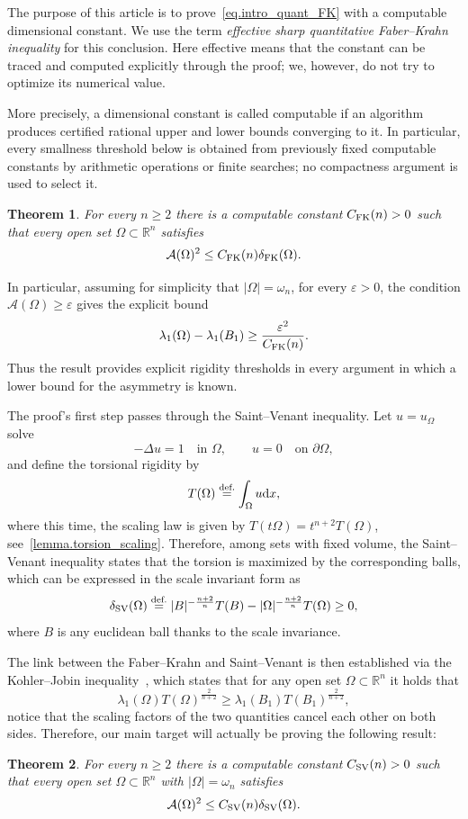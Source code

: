 \documentclass[11pt]{amsart}
\newcommand{\theoname}{Theorem}
\theoremstyle{plain}
\newtheorem{theorem}{\theoname}[section]
\theoremstyle{definition}
\newcommand{\eqdef}{\overset{\text{def.}}{=}}
\def\dd{{\rm d}}
\newcommand\SV{\mathop{\rm SV}}
\begin{document}
The purpose of this article is to prove~\eqref{eq.intro_quant_FK} with a
computable dimensional constant. We use the term \emph{effective sharp
quantitative Faber--Krahn inequality} for this conclusion. Here effective
means that the constant can be traced and computed explicitly through the proof; we, however, do not try to optimize
its numerical value.

More precisely, a dimensional constant is called computable if an algorithm produces certified rational upper and lower bounds
converging to it. In particular, every smallness threshold below is obtained from previously fixed computable constants by arithmetic operations or finite searches; no compactness argument is used to select it.

\begin{theorem}\label{thm.sharp_FK}
For every $n\ge2$ there is a computable constant $C_{\rm FK}(n)>0$ such
that every open set $\Omega\subset\mathbb R^n$ satisfies
\[
  \mathcal A(\Omega)^2
  \le C_{\rm FK}(n)\delta_{\rm FK} (\Omega).
\]
\end{theorem}

In particular, assuming for simplicity that $|\Omega| = \omega_n$, for every $\varepsilon>0$, the condition
$\mathcal A(\Omega)\ge\varepsilon$ gives the explicit bound
\[
  \lambda_1(\Omega)-\lambda_1(B_1)
  \ge \frac{\varepsilon^2}{C_{\rm FK}(n)}.
\]
Thus the result provides explicit rigidity thresholds in every argument in
which a lower bound for the asymmetry is known.

The proof's first step passes through the Saint--Venant inequality. Let $u=u_\Omega$ solve
\[
  -\Delta u=1\quad\text{in }\Omega,
  \qquad
  u=0\quad\text{on }\partial\Omega,
\]
and define the torsional rigidity by
\[
  T(\Omega)\eqdef\int_\Omega u\dd x,
\]
where this time, the scaling law is given by $T(t\Omega) = t^{n+2}T(\Omega)$, see~\ref{lemma.torsion_scaling}. Therefore, among sets with fixed volume, the Saint--Venant inequality states that the torsion is maximized by the corresponding balls, which can be expressed in the scale invariant form as 
\[
    \delta_{\SV}(\Omega)
    \eqdef 
    |B|^{-\frac{n+2}{n}}T(B)-|\Omega|^{-\frac{n+2}{n}}T(\Omega)
    \ge 0, 
\]
where $B$ is any euclidean ball thanks to the scale invariance.

The link between the Faber--Krahn and Saint--Venant is then established via the Kohler--Jobin inequality~\cite{kohler-jobin1978methode,brasco2014torsional}, which states that for any open set $\Omega \subset \mathbb{R}^n$ it holds that
\[
  \lambda_1(\Omega)T(\Omega)^{\frac{2}{n+2}}
  \ge
  \lambda_1(B_1)T(B_1)^{\frac{2}{n+2}},
\]
notice that the scaling factors of the two quantities cancel each other on both sides. Therefore, our main target will actually be proving the following result:
\begin{theorem}\label{thm.sharp_Saint_Venant_unbounded}
For every $n\ge2$ there is a computable constant $C_{\rm SV}(n)>0$ such
that every open set $\Omega\subset\mathbb R^n$ with $|\Omega|=\omega_n$
satisfies
\begin{equation}\label{eq.intro_quant_SV}
  \mathcal A(\Omega)^2
  \le C_{\rm SV}(n)\delta_{\rm SV}(\Omega).
\end{equation}
\end{theorem}
\end{document}
